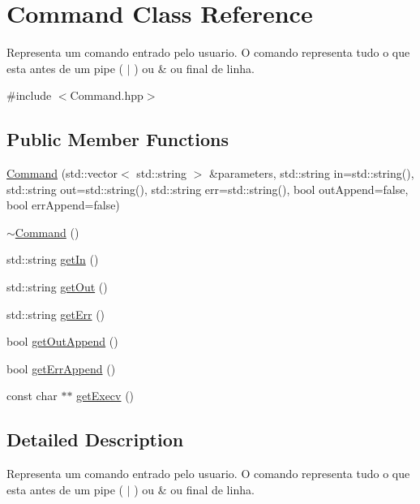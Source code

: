 \hypertarget{classCommand}{
\section{Command Class Reference}
\label{classCommand}
}


Representa um comando entrado pelo usuario. O comando representa tudo o que esta antes de um pipe ( $|$ ) ou \& ou final de linha.  




{\ttfamily \#include $<$Command.hpp$>$}

\subsection*{Public Member Functions}
\begin{DoxyCompactItemize}
\item 
\hyperlink{classCommand_a649b404d34720e098d6e0de6b07ad0c1}{Command} (std::vector$<$ std::string $>$ \&parameters, std::string in=std::string(), std::string out=std::string(), std::string err=std::string(), bool outAppend=false, bool errAppend=false)
\item 
\hyperlink{classCommand_ab552bb3a07fdd1acbfd8ea76e69b2278}{$\sim$Command} ()
\item 
std::string \hyperlink{classCommand_a660ad6733da715bcd5f74a38c04f4527}{getIn} ()
\item 
std::string \hyperlink{classCommand_a63ab07191770dd7f8133e49f8c4552d6}{getOut} ()
\item 
std::string \hyperlink{classCommand_a0421ff1ec0e2aec12fe8a334ceaea3ef}{getErr} ()
\item 
bool \hyperlink{classCommand_a054da0acd3b09e33c40df6865fc29c55}{getOutAppend} ()
\item 
bool \hyperlink{classCommand_a59a9ec8f011e3467e36ad72a8bcd3129}{getErrAppend} ()
\item 
const char $\ast$$\ast$ \hyperlink{classCommand_a37ef9c4ef69e9de78c138b0fe6b98f9f}{getExecv} ()
\end{DoxyCompactItemize}


\subsection{Detailed Description}
Representa um comando entrado pelo usuario. O comando representa tudo o que esta antes de um pipe ( $|$ ) ou \& ou final de linha. 

